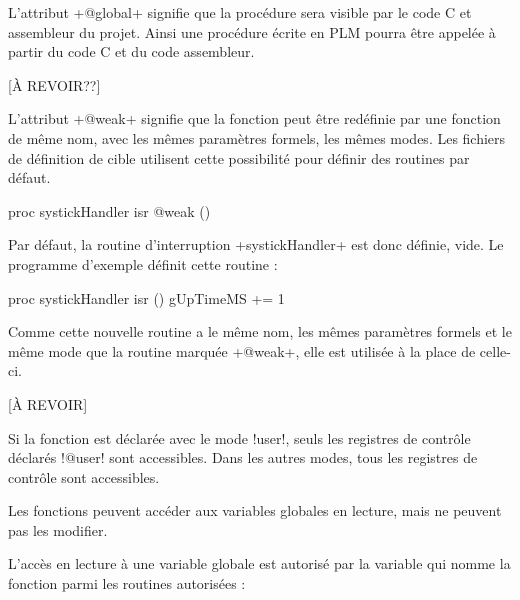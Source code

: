 L'attribut \plm+@global+ signifie que la procédure sera visible par le code C et assembleur du projet. Ainsi une procédure écrite en PLM pourra être appelée à partir du code C et du code assembleur.






[À REVOIR??]


L'attribut \plm+@weak+ signifie que la fonction peut être redéfinie par une fonction de même nom, avec les mêmes paramètres formels, les mêmes modes. Les fichiers de définition de cible utilisent cette possibilité pour définir des routines par défaut.


\begin{PLM}
proc systickHandler isr @weak () {
}
\end{PLM}

Par défaut, la routine d'interruption \plm+systickHandler+ est donc définie, vide. Le programme d'exemple définit cette routine :

\begin{PLM}
proc systickHandler isr () {
  gUpTimeMS += 1
}
\end{PLM}

Comme cette nouvelle routine a le même nom, les mêmes paramètres formels et le même mode que la routine marquée \plm+@weak+, elle est utilisée à la place de celle-ci.






[À REVOIR]

Si la fonction est déclarée avec le mode \plm!user!, seuls les registres de contrôle déclarés \plm!@user! sont accessibles. Dans les autres modes, tous les registres de contrôle sont accessibles.



Les fonctions peuvent accéder aux variables globales en lecture, mais ne peuvent pas les modifier.

L'accès en lecture à une variable globale est autorisé par la variable qui nomme la fonction parmi les routines autorisées :

